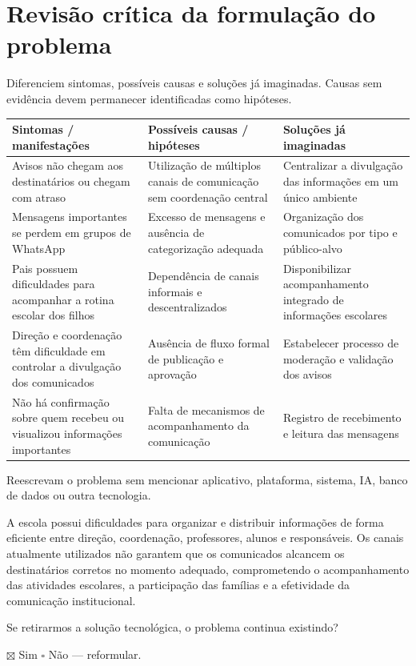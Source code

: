 \section{Revisão crítica da formulação do problema}
Diferenciem sintomas, possíveis causas e soluções já imaginadas. Causas sem evidência devem permanecer identificadas como hipóteses.

\begin{table}[!ht]\centering\small\renewcommand{\arraystretch}{1.35}
\begin{tabularx}{\linewidth}{|>{\raggedright\arraybackslash}X|>{\raggedright\arraybackslash}X|>{\raggedright\arraybackslash}X|}
\hline
\textbf{Sintomas / manifestações} &
\textbf{Possíveis causas / hipóteses} &
\textbf{Soluções já imaginadas} \\
\hline
Avisos não chegam aos destinatários ou chegam com atraso &
Utilização de múltiplos canais de comunicação sem coordenação central &
Centralizar a divulgação das informações em um único ambiente \\
\hline
Mensagens importantes se perdem em grupos de WhatsApp &
Excesso de mensagens e ausência de categorização adequada &
Organização dos comunicados por tipo e público-alvo \\
\hline
Pais possuem dificuldades para acompanhar a rotina escolar dos filhos &
Dependência de canais informais e descentralizados &
Disponibilizar acompanhamento integrado de informações escolares \\
\hline
Direção e coordenação têm dificuldade em controlar a divulgação dos comunicados &
Ausência de fluxo formal de publicação e aprovação &
Estabelecer processo de moderação e validação dos avisos \\
\hline
Não há confirmação sobre quem recebeu ou visualizou informações importantes &
Falta de mecanismos de acompanhamento da comunicação &
Registro de recebimento e leitura das mensagens \\
\hline
\end{tabularx}
\end{table}

\begin{notebox}
Reescrevam o problema sem mencionar aplicativo, plataforma, sistema, IA, banco de dados ou outra tecnologia.
\end{notebox}

A escola possui dificuldades para organizar e distribuir informações de forma eficiente entre direção, coordenação, professores, alunos e responsáveis. Os canais atualmente utilizados não garantem que os comunicados alcancem os destinatários corretos no momento adequado, comprometendo o acompanhamento das atividades escolares, a participação das famílias e a efetividade da comunicação institucional.

\begin{notebox}[Verificação]
Se retirarmos a solução tecnológica, o problema continua existindo?

\noindent $\boxtimes$ Sim \qquad $\square$ Não --- reformular.
\end{notebox}
